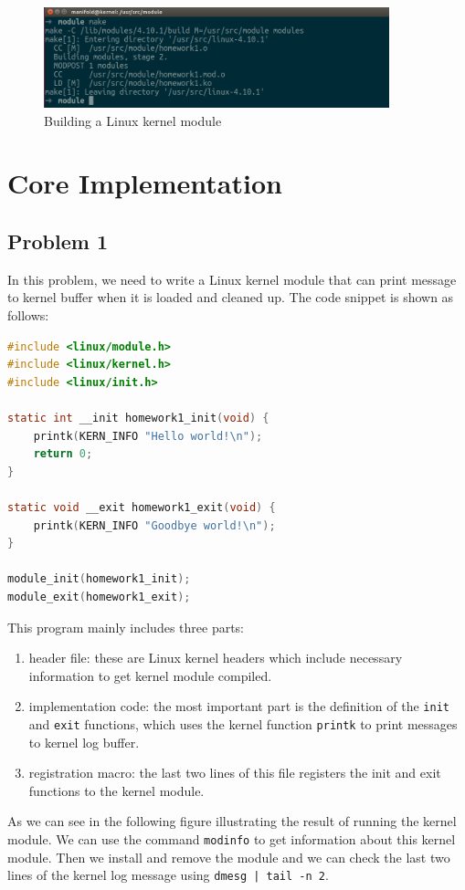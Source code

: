 \documentclass{article}
\begin{document}
\begin{figure}[H]
\centering
\includegraphics[width=10cm]{makehw1.png}
\caption{Building a Linux kernel module}
\end{figure}

\section{Core Implementation}
\subsection{Problem 1}
In this problem, we need to write a Linux kernel module that can print message to kernel buffer when it is loaded and cleaned up. The code snippet is shown as follows:
\begin{lstlisting}[language=c,caption=Module that output info on installation and exit]
#include <linux/module.h>
#include <linux/kernel.h>
#include <linux/init.h>

static int __init homework1_init(void) {
    printk(KERN_INFO "Hello world!\n");
    return 0;
}

static void __exit homework1_exit(void) {
    printk(KERN_INFO "Goodbye world!\n");
}

module_init(homework1_init);
module_exit(homework1_exit);
\end{lstlisting}

This program mainly includes three parts:
\begin{enumerate}
\item header file: these are Linux kernel headers which include necessary information to get kernel module compiled.
\item implementation code: the most important part is the definition of the \texttt{init} and \texttt{exit} functions, which uses the kernel function \texttt{printk} to print messages to kernel log buffer.
\item registration macro: the last two lines of this file registers the init and exit functions to the kernel module.
\end{enumerate}

As we can see in the following figure illustrating the result of running the kernel module. We can use the command \texttt{modinfo} to get information about this kernel module.
Then we install and remove the module and we can check the last two lines of the kernel log message using \texttt{dmesg | tail -n 2}.
\end{document}
